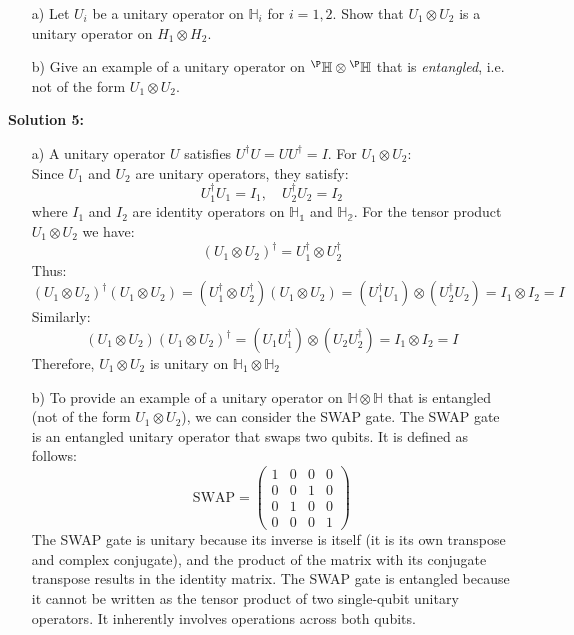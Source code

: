 \documentclass{article}
\renewcommand{\H}{\mathbb{H}}
\begin{document}
\begin{question}
    \begin{enumerate}
        \item[a)] Let $U_i$ be a unitary operator on $\H_i$ for $i=1,2.$ Show that $U_1 \otimes U_2$ is a unitary operator on $H_1 \otimes H_2$.
        \item[b)] Give an example of a unitary operator on ${}^\P\H \otimes {}^\P\H $ that is \textit{entangled}, i.e. not of the form $U_1 \otimes U_2.$ 
    \end{enumerate}
\end{question}

\textbf{Solution 5:} 
\begin{enumerate}
    \item[a)] A unitary operator $U$ satisfies $U^\dagger U=UU^\dagger=I$. For $U_1 \otimes U_2$:\\
    Since $U_1$ and $U_2$ are unitary operators, they satisfy: $$U_1^\dagger U_1 =I_1, \quad U_2^\dagger U_2=I_2$$ where $I_1$ and $I_2$ are identity operators on $\mathbb{H_1}$ and $\mathbb{H_2}$. For the tensor product $U_1 \otimes U_2$ we have: $$(U_1 \otimes U_2)^\dagger = U_1^\dagger \otimes U_2^\dagger$$ Thus: $$(U_1 \otimes U_2)^\dagger (U_1 \otimes U_2) = (U_1^\dagger \otimes U_2^\dagger)(U_1 \otimes U_2) = (U_1^\dagger U_1) \otimes (U_2^\dagger U_2) = I_1 \otimes I_2 = I$$
    Similarly: $$(U_1 \otimes U_2)(U_1 \otimes U_2)^\dagger = (U_1 U_1^\dagger) \otimes (U_2 U_2^\dagger) = I_1 \otimes I_2 = I$$
    Therefore, $U_1 \otimes U_2$ is unitary on $\mathbb{H}_1\otimes\mathbb{H}_2$
    \item[b)] To provide an example of a unitary operator on $\mathbb{H} \otimes \mathbb{H}$ that is entangled (not of the form $U_1 \otimes U_2$), we can consider the SWAP gate. The SWAP gate is an entangled unitary operator that swaps two qubits. It is defined as follows:
    $$\text{SWAP} = \begin{pmatrix}
    1 & 0 & 0 & 0 \\
    0 & 0 & 1 & 0 \\
    0 & 1 & 0 & 0 \\
    0 & 0 & 0 & 1 \end{pmatrix}$$
    The SWAP gate is unitary because its inverse is itself (it is its own transpose and complex conjugate), and the product of the matrix with its conjugate transpose results in the identity matrix. The SWAP gate is entangled because it cannot be written as the tensor product of two single-qubit unitary operators. It inherently involves operations across both qubits.
\end{enumerate}
\end{document}

